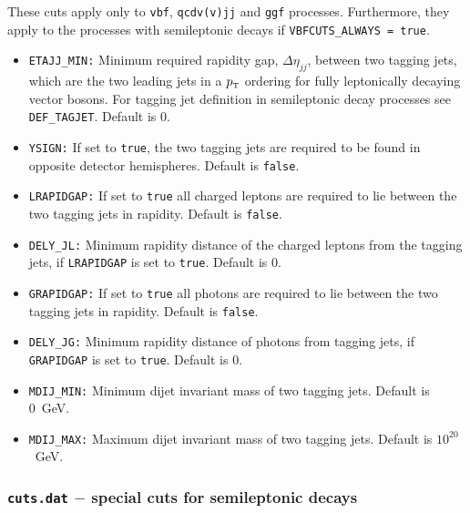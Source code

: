 \documentclass[english,12pt]{article}
\newcommand\sss{\mathchoice%
{\displaystyle}%
{\scriptstyle}%
{\scriptscriptstyle}%
{\scriptscriptstyle}%
}
\newcommand\pt{p_{\sss\rm T}}
\begin{document}
These cuts apply only to {\tt vbf}, {\tt qcdv(v)jj} and {\tt ggf} processes.
Furthermore, they apply to the processes with semileptonic decays if {\tt VBFCUTS\_ALWAYS = true}.
\begin{itemize}
\item {\tt ETAJJ\_MIN:} Minimum required rapidity gap, $\Delta \eta_{jj}$,
between  two tagging jets, which are the two leading jets in a $\pt$ ordering for fully leptonically
decaying vector bosons. For tagging jet definition in semileptonic decay processes see
{\tt DEF\_TAGJET}. Default is 0.
\item {\tt YSIGN:} If set to {\tt true}, the two tagging jets are required to
be found in opposite detector hemispheres. Default is {\tt false}.
\item {\tt LRAPIDGAP:} If set to {\tt true} all charged leptons are
required to lie between the two tagging jets in rapidity. Default is {\tt false}.
\item {\tt DELY\_JL:} Minimum rapidity distance of the charged leptons from the tagging jets,
  if {\tt LRAPIDGAP} is set to {\tt true}.  Default is 0.
\item {\tt GRAPIDGAP:} If set to {\tt true} all photons are
required to lie between the two tagging jets in rapidity. Default is {\tt false}.
\item {\tt DELY\_JG:} Minimum rapidity distance of photons from tagging jets,
  if {\tt GRAPIDGAP} is set to {\tt true}.  Default is 0.
\item {\tt MDIJ\_MIN:} Minimum dijet invariant mass of two tagging
  jets. Default is 0~GeV.
\item {\tt MDIJ\_MAX:} Maximum dijet invariant mass of
two tagging jets. Default is $10^{20}$~GeV. 
\end{itemize}

\subsubsection{{\tt cuts.dat} $-$ special cuts for semileptonic decays}
\end{document}
